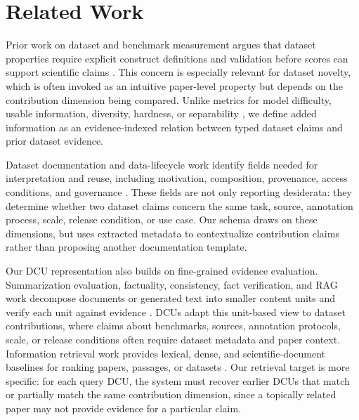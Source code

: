 \documentclass[11pt]{article}
\begin{document}
\section{Related Work}
Prior work on dataset and benchmark measurement argues that dataset properties require explicit construct definitions and validation before scores can support scientific claims \citep{bean2025construct,raji2021benchmark,zhao2024measure,jacobs2021measurement}.
This concern is especially relevant for dataset novelty, which is often invoked as an intuitive paper-level property but depends on the contribution dimension being compared.
Unlike metrics for model difficulty, usable information, diversity, hardness, or separability \citep{ethayarajh2022understanding,mitchell2022measuring,vivek2024anchor,friedman2023vendi,yao2025measure}, we define added information as an evidence-indexed relation between typed dataset claims and prior dataset evidence.

Dataset documentation and data-lifecycle work identify fields needed for interpretation and reuse, including motivation, composition, provenance, access conditions, and governance \citep{gebru2021datasheets,bender2018data,pushkarna2022data,holland2018nutrition,paullada2021data}.
These fields are not only reporting desiderata: they determine whether two dataset claims concern the same task, source, annotation process, scale, release condition, or use case.
Our schema draws on these dimensions, but uses extracted metadata to contextualize contribution claims rather than proposing another documentation template.

Our DCU representation also builds on fine-grained evidence evaluation.
Summarization evaluation, factuality, consistency, fact verification, and RAG work decompose documents or generated text into smaller content units and verify each unit against evidence \citep{nenkova2004pyramid,min2023factscore,wan2024acueval,fabbri2022qafacteval,laban2022summac,thorne2018fever,raina2024question}.
DCUs adapt this unit-based view to dataset contributions, where claims about benchmarks, sources, annotation protocols, scale, or release conditions often require dataset metadata and paper context.
Information retrieval work provides lexical, dense, and scientific-document baselines for ranking papers, passages, or datasets \citep{robertson2009probabilistic,reimers2019sentence,cohan2020specter,ostendorff2022scincl,noy2019google,chapman2020dataset,viswanathan2023datafinder}.
Our retrieval target is more specific: for each query DCU, the system must recover earlier DCUs that match or partially match the same contribution dimension, since a topically related paper may not provide evidence for a particular claim.
\end{document}
